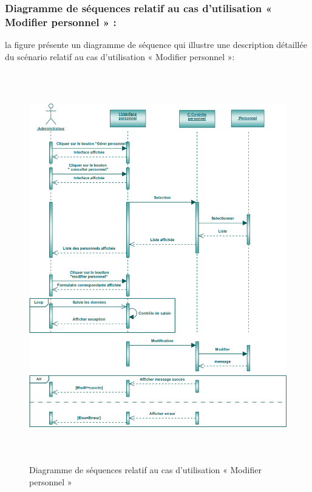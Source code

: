\documentclass[12 pt]{report}
\begin{document}
\subsubsection{Diagramme de séquences relatif au cas d’utilisation « Modifier personnel » :}
la figure   présente un diagramme de séquence qui illustre une description détaillée du scénario relatif au cas d’utilisation « Modifier personnel »: 
{\begin{figure}[h]
 \begin{center}
\includegraphics[width= 18 cm ,height=  17cm]{sec_modif_per.PNG}
\caption{Diagramme de séquences relatif au cas d’utilisation « Modifier personnel  »}

\end{center}
\end{figure}}
\newpage
\end{document}
